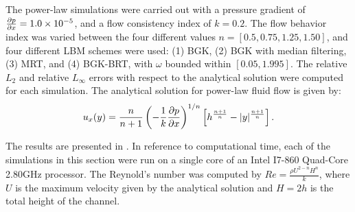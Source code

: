 \documentclass[pdftex,ms]{pittetd}
\begin{document}
The power-law simulations were carried out with a pressure gradient of $\frac{\partial p}{\partial x} = 1.0 \times 10^{-5}$, and a flow consistency index of $k = 0.2$.
The flow behavior index was varied between the four different values $n = [0.5, 0.75, 1.25, 1.50]$, and four different LBM schemes were used: (1) BGK, (2) BGK with median filtering, (3) MRT, and (4) BGK-BRT, with $\omega$ bounded within $[0.05, 1.995]$. 
The relative $L_2$ and relative $L_{\infty}$ errors with respect to the analytical solution were computed for each simulation.
The analytical solution for power-law fluid flow is given by:
\begin{equation} \label{eq:analytical-power-law}
  u_x(y) = \frac{n}{n+1}\left(-\frac{1}{k}\frac{\partial p}{\partial x}\right)^{1/n}\left[h^{\frac{n+1}{n}} - |y|^{\frac{n+1}{n}}\right].
\end{equation}

The results are presented in .
In reference to computational time, each of the simulations in this section were run on a single core of an Intel I7-860 Quad-Core 2.80GHz processor.
The Reynold's number was computed by $Re = \frac{\rho U^{2-n} H^n}{k}$, where $U$ is the maximum velocity given by the analytical solution and $H = 2h$ is the total height of the channel.

\end{document}
